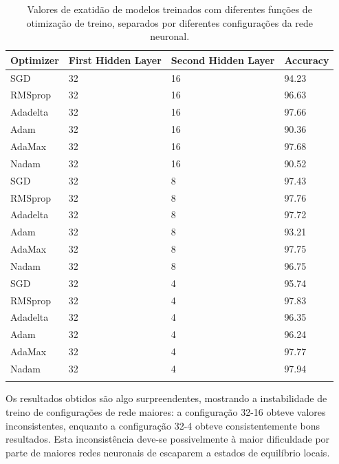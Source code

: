 \documentclass[]{article}
\begin{document}
\begin{table}[h!]
\centering
  \begin{tabular}{llll}
  \hline
  Optimizer & First Hidden Layer & Second Hidden Layer & Accuracy \\ \hline
  SGD		& 32                 & 16                 & 94.23    \\
  RMSprop	& 32                 & 16                 & 96.63    \\
  Adadelta	& 32                 & 16                 & 97.66    \\
  Adam		& 32                 & 16                 & 90.36    \\
  AdaMax	& 32                 & 16                 & 97.68    \\
  Nadam		& 32                 & 16                 & 90.52    \\ \hline
  SGD		& 32                 & 8                 & 97.43    \\
  RMSprop	& 32                 & 8                 & 97.76    \\
  Adadelta	& 32                 & 8                 & 97.72    \\
  Adam		& 32                 & 8                 & 93.21    \\
  AdaMax	& 32                 & 8                 & 97.75    \\
  Nadam		& 32                 & 8                 & 96.75    \\ \hline
  SGD		& 32                 & 4                 & 95.74    \\
  RMSprop	& 32                 & 4                 & 97.83    \\
  Adadelta	& 32                 & 4                 & 96.35    \\
  Adam		& 32                 & 4                 & 96.24    \\
  AdaMax	& 32                 & 4                 & 97.77    \\
  Nadam		& 32                 & 4                 & 97.94    \\ \hline \\
\end{tabular}
  \caption{Valores de exatidão de modelos treinados com diferentes funções de otimização de treino, separados por diferentes configurações da rede neuronal.}
  \label{tab:grid_search_optimizers}
\end{table}


Os resultados obtidos são algo surpreendentes, mostrando a instabilidade de treino de configurações de rede maiores: a configuração 32-16 obteve valores inconsistentes, enquanto a configuração 32-4 obteve consistentemente bons resultados. Esta inconsistência deve-se possivelmente à maior dificuldade por parte de maiores redes neuronais de escaparem a estados de equilíbrio locais.
\end{document}
